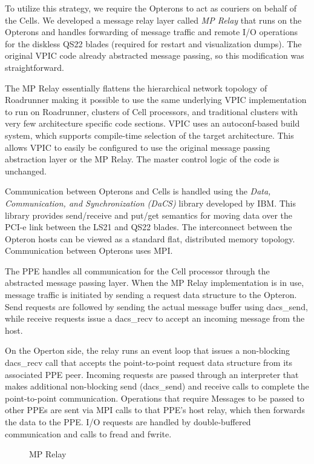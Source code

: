 \documentclass[letter,10pt]{article}
\begin{document}
To utilize this strategy, we require the Opterons to act as couriers
on behalf of the Cells.  We developed a message relay layer called
\emph{MP Relay} that runs on the Opterons and handles forwarding of
message traffic and remote I/O operations for the diskless QS22 blades
(required for restart and visualization dumps).  The original VPIC
code already abstracted message passing, so this modification was
straightforward.

The MP Relay essentially flattens the hierarchical network topology of
Roadrunner making it possible to use the same underlying VPIC
implementation to run on Roadrunner, clusters of Cell processors, and
traditional clusters with very few architecture specific code
sections.  VPIC uses an autoconf-based build system, which supports
compile-time selection of the target architecture.  This allows VPIC
to easily be configured to use the original message passing
abstraction layer or the MP Relay.  The master control logic of the
code is unchanged.

Communication between Opterons and Cells is handled using the
\emph{Data, Communication, and Synchronization (DaCS)} library developed by
IBM.  This library provides send/receive and put/get semantics
for moving data over the PCI-e link between the LS21 and QS22 blades.
The interconnect between the Opteron hosts can be viewed as
a standard flat, distributed memory topology.  Communication between
Opterons uses MPI.

The PPE handles all communication for the Cell processor through the
abstracted message passing layer.  When the MP Relay implementation is
in use, message traffic is initiated by sending a request data
structure to the Opteron.  Send requests are followed by sending the
actual message buffer using dacs\_send, while receive requests issue a
dacs\_recv to accept an incoming message from the host.

On the Operton side, the relay runs an event loop that issues a
non-blocking dacs\_recv call that accepts the point-to-point request
data structure from its associated PPE peer.  Incoming requests are
passed through an interpreter that makes additional non-blocking send
(dacs\_send) and receive calls to complete the point-to-point
communication.  Operations that require Messages to be passed to other
PPEs are sent via MPI calls to that PPE's host relay, which then
forwards the data to the PPE.  I/O requests are handled by
double-buffered communication and calls to fread and fwrite.

\begin{figure}
    \begin{center}
    \scalebox{0.25}{}
    \caption{MP Relay}
    \label{fig:relay}
    \end{center}
\end{figure}
\end{document}
